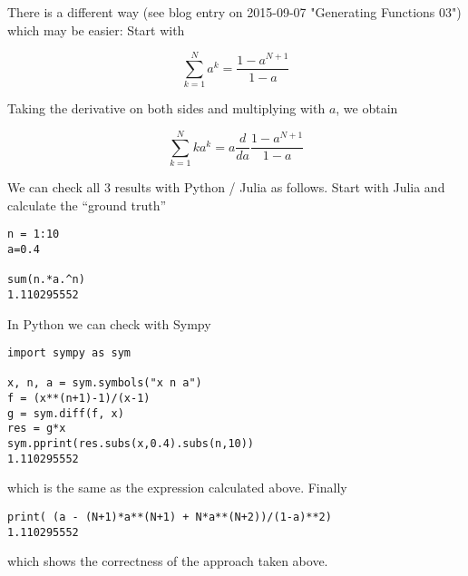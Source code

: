There is a different way (see blog entry on 2015-09-07 "Generating Functions 03") which may be easier: Start with

\[ \sum_{k=1}^N a^k = \frac{1 - a^{N+1} }{1 - a} \]

Taking the derivative on both sides and multiplying with $a$, we obtain

\[ \sum_{k=1}^N k a^k = a \frac{d}{da} \frac{1 - a^{N+1} }{1 - a} \]

We can check all 3 results with Python / Julia as follows. Start with Julia and calculate the ``ground truth''

\begin{verbatim}
n = 1:10
a=0.4

sum(n.*a.^n)
1.110295552
\end{verbatim}

In Python we can check with Sympy

\begin{verbatim}
import sympy as sym

x, n, a = sym.symbols("x n a")
f = (x**(n+1)-1)/(x-1)
g = sym.diff(f, x)
res = g*x
sym.pprint(res.subs(x,0.4).subs(n,10))
1.110295552
\end{verbatim}

which is the same as the expression calculated above. Finally

\begin{verbatim}
print( (a - (N+1)*a**(N+1) + N*a**(N+2))/(1-a)**2)
1.110295552
\end{verbatim}

which shows the correctness of the approach taken above.
